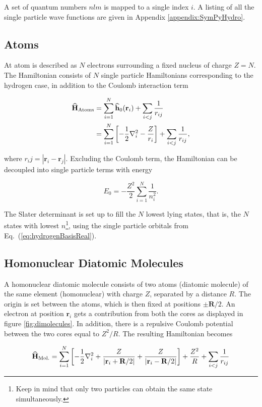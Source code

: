 A set of quantum numbers $nlm$ is mapped to a single index $i$. A listing of all the single particle wave functions are given in Appendix \ref{appendix:SymPyHydro}.

\subsection{Atoms}

At atom is described as $N$ electrons surrounding a fixed nucleus of charge $Z=N$. The Hamiltonian consists of $N$ single particle Hamiltonians corresponding to the hydrogen case, in addition to the Coulomb interaction term

\begin{align}
 {\bf\widehat{H}}_{\mathrm{Atoms}} &= \sum_{i=1}^N {\bf\widehat{h}}_0(\mathbf{r}_i) + \sum_{i<j} \frac{1}{r_{ij}} \\
                         &= \sum_{i=1}^N \left[-\frac{1}{2}\nabla_i^2 - \frac{Z}{r_i}\right] + \sum_{i<j} \frac{1}{r_{ij}},
\end{align}

where $r_ij = |\mathbf{r}_i -\mathbf{r}_j|$. Excluding the Coulomb term, the Hamiltonian can be decoupled into single particle terms with energy

\begin{equation}
 E_0 = -\frac{Z^2}{2}\sum_{i=1}^N \frac{1}{n_i^2}.
\end{equation}

The Slater determinant is set up to fill the $N$ lowest lying states, that is, the $N$ states with lowest $n$\footnote{Keep in mind that only two particles can obtain the same state simultaneously.}, using the single particle orbitals from Eq.~(\ref{eq:hydrogenBasisReal}).

\subsection{Homonuclear Diatomic Molecules}

A homonuclear diatomic molecule consists of two atoms (diatomic molecule) of the same element (homonuclear) with charge $Z$, separated by a distance $R$. The origin is set between the atoms, which is then fixed at positions $\pm \mathbf{R}/2$. An electron at position $\mathbf{r}_i$ gets a contribution from both the cores as displayed in figure \ref{fig:dimolecules}. In addition, there is a repulsive Coulomb potential between the two cores equal to $Z^2/R$. The resulting Hamiltonian becomes

\begin{equation}
 {\bf\widehat{H}}_{\mathrm{Mol.}} = \sum_{i=1}^N \left[-\frac{1}{2}\nabla_i^2 + \frac{Z}{|\mathbf{r}_i + \mathbf{R}/2|} + \frac{Z}{|\mathbf{r}_i - \mathbf{R}/2|}\right] + \frac{Z^2}{R} + \sum_{i<j} \frac{1}{r_{ij}}
\end{equation}



